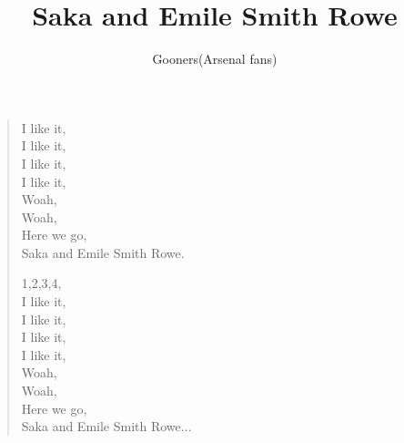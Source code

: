 \documentclass[a4paper,12pt]{article}
\title{Saka and Emile Smith Rowe}
\author{Gooners(Arsenal fans)}
\date{}
\begin{document}
	
	\maketitle
	
	\begin{verse}
		
		I like it, \\
		I like it, \\
		I like it, \\
		I like it, \\
		Woah, \\
		Woah, \\
		Here we go, \\
		Saka and Emile Smith Rowe.\par		
		1,2,3,4, \\
		I like it, \\
		I like it, \\
		I like it, \\
		I like it, \\
		Woah, \\
		Woah, \\
		Here we go, \\
		Saka and Emile Smith Rowe$\ldots$
		
	\end{verse}
	
\end{document}
